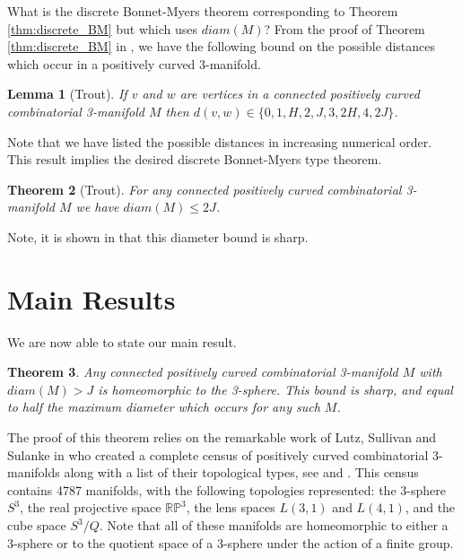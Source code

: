 \documentclass[12pt]{article}
\newtheorem{thm}{Theorem}[section]
\newtheorem{lem}[thm]{Lemma}
\begin{document}
What is the discrete Bonnet-Myers theorem corresponding to Theorem \ref{thm:discrete_BM} but which uses $diam(M)$? From the proof of Theorem \ref{thm:discrete_BM} in \cite{Trout10}, we have the following bound on the possible distances which occur in a positively curved 3-manifold.

\begin{lem}[Trout] If $v$ and $w$ are vertices in a connected positively curved combinatorial 3-manifold $M$ then $d(v,w) \in \{0, 1, H, 2, J, 3, 2H, 4, 2J \}$.
\end{lem}

\noindent Note that we have listed the possible distances in increasing numerical order. This result implies the desired discrete Bonnet-Myers type theorem.

\begin{thm}[Trout] For any connected positively curved combinatorial 3-manifold $M$ we have $diam(M) \leq 2J$.
\label{thm:discrete_BM_expanded_paths}
\end{thm}

\noindent Note, it is shown in \cite{Trout10} that this diameter bound is sharp.

\section{Main Results}

We are now able to state our main result.

\begin{thm} Any connected positively curved combinatorial 3-manifold $M$ with $diam(M)>J$ is homeomorphic to the 3-sphere. This bound is sharp, and equal to half the maximum diameter which occurs for any such $M$.
\label{thm:discrete_GS}
\end{thm}

\noindent The proof of this theorem relies on the remarkable work of Lutz, Sullivan and Sulanke in \cite{Lutz07, LutzSul_unpub, sulanke2009isomorphism} who created a complete census of positively curved combinatorial 3-manifolds along with a list of their topological types, see \cite{Lutz_online_manifolds} and \cite{Lutz_online_topological_types}. This census contains 4787 manifolds, with the following topologies represented: the 3-sphere $S^3$, the real projective space $\mathbb{RP}^3$, the lens spaces $L(3,1)$ and $L(4,1)$, and the cube space $S^3/Q$. Note that all of these manifolds are homeomorphic to either a 3-sphere or to the quotient space of a 3-sphere under the action of a finite group. 
\end{document}
